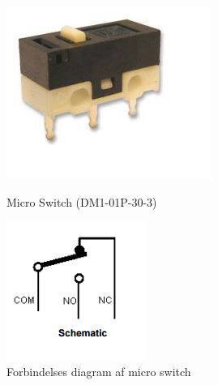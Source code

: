 \begin{figure}[H]
\centering
\begin{minipage}{.5\textwidth}
  \centering
  \includegraphics[width=\linewidth]{0_Filer/Figuer/5_HW_Design/Micro_switch.png}
  \caption{Micro Switch (DM1-01P-30-3)}
  \label{fig:HWD_Micro_switch}
\end{minipage}%
\begin{minipage}{.5\textwidth}
  \centering
  \includegraphics[width=\linewidth]{0_Filer/Figuer/5_HW_Design/Micro_switch_diagram.png}
  \caption{Forbindelses diagram af micro switch}
  \label{fig:HWD_Micro_Diagram}
\end{minipage}
\end{figure}

